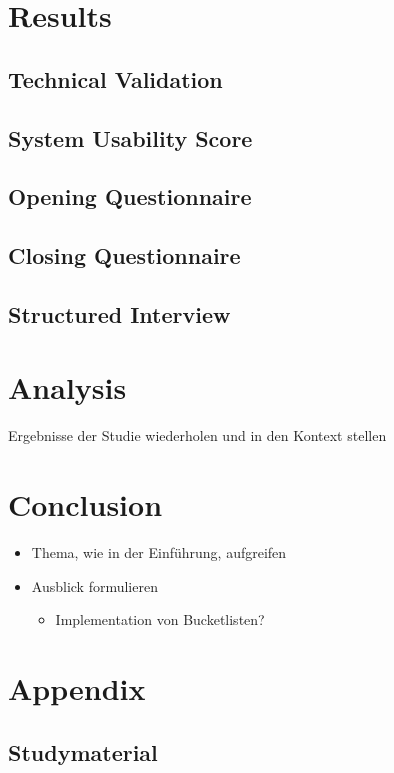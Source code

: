 \documentclass[12pt,numbers=noenddot,parskip,bibliography=totocnumbered,listof=totocnumbered]{scrreprt}
\begin{document}
\chapter{Results}

\section{Technical Validation}

\section{System Usability Score}

\section{Opening Questionnaire}

\section{Closing Questionnaire}

\section{Structured Interview}

\chapter{Analysis}
Ergebnisse der Studie wiederholen und in den Kontext stellen

\chapter{Conclusion}
\begin{itemize} 
	\item Thema, wie in der Einführung, aufgreifen
	\item Ausblick formulieren
	\begin{itemize} 
		\item Implementation von Bucketlisten?
	\end{itemize} 
\end{itemize} 


\appendix
\chapter{Appendix}
\newpage
\section{Studymaterial}
\vspace*{\fill}
\label{lab:Studymaterial}
\vspace*{\fill}
\end{document}
